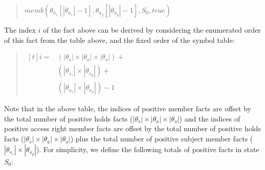 \documentclass[10pt, twocolumn]{article}
\begin{document}
          \begin{quote}
            $memb({\theta}_{a_s}[|{\theta}_{a_s}| - 1], {\theta}_{a_g}[|{\theta}_{a_g}| - 1], S_{0}, true)$
          \end{quote}

          The index $i$ of the fact above can be derived by considering the
          enumerated order of this fact from the table above, and the fixed
          order of the symbol table:

          \begin{quote}
            \begin{math}
              \begin{aligned}[t]
                i =& (|{\theta}_{s}| \times |{\theta}_{a}| \times |{\theta}_{o}|) + \\
                & (|{\theta}_{s_s}| \times |{\theta}_{s_g}|) + \\
                & (|{\theta}_{a_s}| \times |{\theta}_{a_g}|) - 1
              \end{aligned}
            \end{math}
          \end{quote}

          Note that in the above table, the indices of positive member facts
          are offset by the total number of positive holds facts
          ($|{\theta}_{s}| \times |{\theta}_{a}| \times |{\theta}_{o}|$) and
          the indices of positive access right member facts are offset by the
          total number of positive holds facts ($|{\theta}_{s}| \times
          |{\theta}_{a}| \times |{\theta}_{o}|$) plus the total number of
          positive subject member facts ($|{\theta}_{s_s}| \times
          |{\theta}_{s_g}|$). For simplicity, we define the following totals
          of positive facts in state $S_{0}$:
\end{document}

